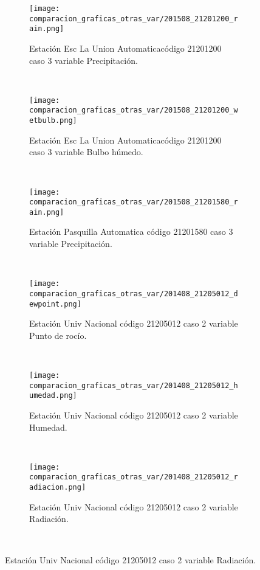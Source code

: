 \begin{figure}[H]
\centering
\begin{subfigure}[normla]{0.4\textwidth}
\caption{Estación Esc La Union Automaticacódigo 21201200 caso 3 variable Precipitación.}
\texttt{[image: comparacion\_graficas\_otras\_var/201508\_21201200\_rain.png]}
\end{subfigure}
~
\begin{subfigure}[normla]{0.4\textwidth}
\caption{Estación Esc La Union Automaticacódigo 21201200 caso 3 variable Bulbo húmedo.}
\texttt{[image: comparacion\_graficas\_otras\_var/201508\_21201200\_wetbulb.png]}
\end{subfigure}
~
\begin{subfigure}[normla]{0.4\textwidth}
\caption{Estación Pasquilla Automatica código 21201580 caso 3 variable Precipitación.}
\texttt{[image: comparacion\_graficas\_otras\_var/201508\_21201580\_rain.png]}
\end{subfigure}
~
\begin{subfigure}[normla]{0.4\textwidth}
\caption{Estación Univ Nacional código 21205012 caso 2 variable Punto de rocío.}
\texttt{[image: comparacion\_graficas\_otras\_var/201408\_21205012\_dewpoint.png]}
\end{subfigure}
~
\begin{subfigure}[normla]{0.4\textwidth}
\caption{Estación Univ Nacional código 21205012 caso 2 variable Humedad.}
\texttt{[image: comparacion\_graficas\_otras\_var/201408\_21205012\_humedad.png]}
\end{subfigure}
~
\begin{subfigure}[normla]{0.4\textwidth}
\caption{Estación Univ Nacional código 21205012 caso 2 variable Radiación.}
\texttt{[image: comparacion\_graficas\_otras\_var/201408\_21205012\_radiacion.png]}
\end{subfigure}
~
\end{figure}
           
